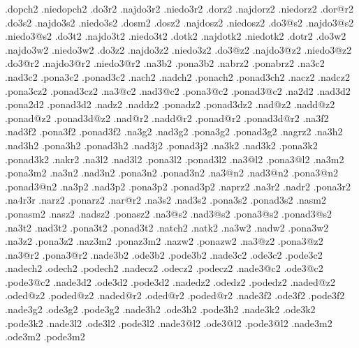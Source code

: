 {  .dopch2              .niedopch2
  .do3r2   .najdo3r2   .niedo3r2   
  .dorz2   .najdorz2   .niedorz2   
  .dor@r2  
  .do3s2   .najdo3s2   .niedo3s2   
  .dosm2   
  .dosz2   .najdosz2   .niedosz2   
  .do3@s2  .najdo3@s2  .niedo3@s2  
  .do3t2   .najdo3t2   .niedo3t2   
  .dotk2   .najdotk2   .niedotk2   
  .dotr2
  .do3w2   .najdo3w2   .niedo3w2   
  .do3z2   .najdo3z2   .niedo3z2   
  .do3@z2  .najdo3@z2  .niedo3@z2  
  .do3@r2  .najdo3@r2  .niedo3@r2  
%
%
  .na3b2               .pona3b2    
  .nabrz2              .ponabrz2     
  .na3c2   .nad3c2     .pona3c2     .ponad3c2
  .nach2   .nadch2     .ponach2     .ponad3ch2
  .nacz2   .nadcz2     .pona3cz2    .ponad3cz2
  .na3@c2  .nad3@c2    .pona3@c2    .ponad3@c2
  .na2d2   .nad3d2     .pona2d2     .ponad3d2
  .nadz2   .naddz2     .ponadz2     .ponad3dz2
  .nad@z2  .nadd@z2    .ponad@z2    .ponad3d@z2
  .nad@r2  .nadd@r2    .ponad@r2    .ponad3d@r2
  .na3f2   .nad3f2     .pona3f2     .ponad3f2
  .na3g2   .nad3g2     .pona3g2     .ponad3g2
  .nagrz2
  .na3h2   .nad3h2     .pona3h2     .ponad3h2
           .nad3j2                  .ponad3j2 
  .na3k2   .nad3k2     .pona3k2     .ponad3k2
  .nakr2
  .na3l2   .nad3l2     .pona3l2     .ponad3l2
  .na3@l2              .pona3@l2   
  .na3m2               .pona3m2    
  .na3n2   .nad3n2     .pona3n2     .ponad3n2
  .na3@n2  .nad3@n2    .pona3@n2    .ponad3@n2
  .na3p2   .nad3p2     .pona3p2     .ponad3p2
  .naprz2 
  .na3r2   .nadr2      .pona3r2     
  .na4r3r
  .narz2               .ponarz2    
  .nar@r2
  .na3s2   .nad3s2     .pona3s2     .ponad3s2
  .nasm2               .ponasm2
  .nasz2   .nadsz2     .ponasz2    
  .na3@s2  .nad3@s2    .pona3@s2    .ponad3@s2
  .na3t2   .nad3t2     .pona3t2     .ponad3t2
  .natch2
  .natk2  
  .na3w2   .nadw2      .pona3w2     
  .na3z2               .pona3z2     
  .naz3m2              .ponaz3m2 
  .nazw2               .ponazw2 
  .na3@z2              .pona3@z2   
  .na3@r2              .pona3@r2   
%
%
  .nade3b2   .ode3b2   .pode3b2   
  .nade3c2   .ode3c2   .pode3c2   
  .nadech2   .odech2   .podech2   
  .nadecz2   .odecz2   .podecz2   
  .nade3@c2  .ode3@c2  .pode3@c2  
  .nade3d2   .ode3d2   .pode3d2   
  .nadedz2   .odedz2   .podedz2   
  .naded@z2  .oded@z2  .poded@z2  
  .naded@r2  .oded@r2  .poded@r2  
  .nade3f2   .ode3f2   .pode3f2   
  .nade3g2   .ode3g2   .pode3g2   
  .nade3h2   .ode3h2   .pode3h2   
  .nade3k2   .ode3k2   .pode3k2   
  .nade3l2   .ode3l2   .pode3l2   
  .nade3@l2  .ode3@l2  .pode3@l2  
  .nade3m2   .ode3m2   .pode3m2   
}
